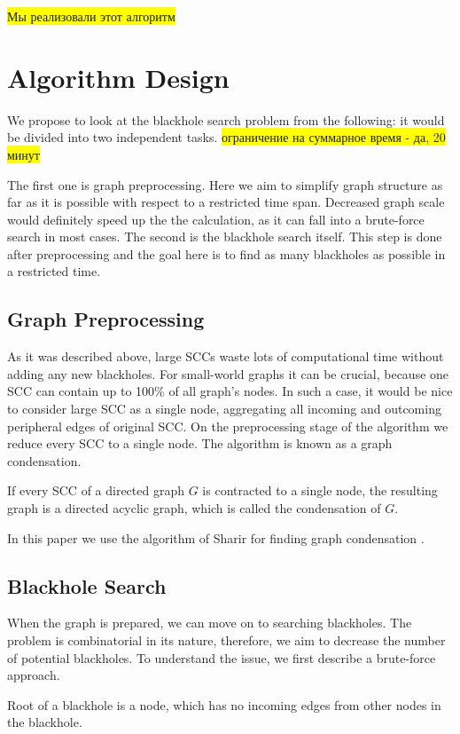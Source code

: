 \documentclass{svproc}
\newcommand{\FIXME}[1]{ %
	\colorbox{yellow}{#1}
}
\newcommand{\FIXME}[1]{ %
}
\begin{document}
\FIXME{Мы реализовали этот алгоритм}

\section{Algorithm Design}
We propose to look at the blackhole search problem from the following: it would be divided into two independent tasks. 
\FIXME{ограничение на суммарное время - да, 20 минут}
The first one is graph preprocessing. Here we aim to simplify graph structure as far as it is possible with respect to a restricted time span. 
Decreased graph scale would definitely speed up the the calculation, as it can fall into a brute-force search in most cases.
The second is the blackhole search itself. This step is done after preprocessing and the goal here is to find as many blackholes as possible in a restricted time.

%
\subsection{Graph Preprocessing}
As it was described above, large SCCs waste lots of computational time without adding any new blackholes. 
For small-world graphs it can be crucial, because one SCC can contain up to 100\% of all graph's nodes. 
In such a case, it would be nice to consider large SCC as a single node, aggregating all incoming and outcoming peripheral edges
of original SCC.
On the preprocessing stage of the algorithm we reduce every SCC to a single node. The algorithm is known as a graph condensation.

\begin{definition}
If every SCC of a directed graph $G$ is contracted to a single node, the resulting graph is a directed acyclic graph, which is called the condensation of $G$.
\end{definition}

In this paper we use the algorithm of Sharir for finding graph condensation \cite{sharir1981strong}. 

\subsection{Blackhole Search}
When the graph is prepared, we can move on to searching blackholes. The problem is combinatorial in its nature, therefore, we aim to
decrease the number of potential blackholes.
To understand the issue, we first describe a brute-force approach. 

\begin{definition}
Root of a blackhole is a node, which has no incoming edges from other nodes in the blackhole.
\end{definition}
\end{document}
